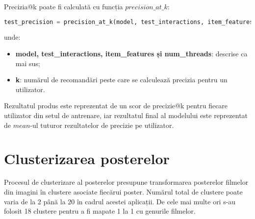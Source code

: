 Precizia@k poate fi calculată cu funcția $precision\_at\_k$:

\begin{lstlisting}[language=Python, caption=\textit{Precizia@k a unui model}]
test_precision = precision_at_k(model, test_interactions, item_features=item_features, k=k, num_threads=threads).mean()
\end{lstlisting}
unde:
\begin{itemize}
	\item \textbf{model, test\_interactions, item\_features și num\_threads}: descrise ca mai sus;
	\item \textbf{k}: numărul de recomandări peste care se calculează precizia pentru un utilizator.
\end{itemize}
Rezultatul produs este reprezentat de un scor de precizie@k pentru fiecare utilizator din setul de antrenare, iar rezultatul final al modelului este reprezentat de $mean$-ul tuturor rezultatelor de precizie pe utilizator.

\section{Clusterizarea posterelor}
Procesul de clusterizare al posterelor presupune transformarea posterelor filmelor din imagini în clustere asociate fiecărui poster. Numărul total de clustere poate varia de la 2 până la 20 în cadrul acestei aplicații. De cele mai multe ori s-au folosit 18 clustere pentru a fi mapate 1 la 1 cu genurile filmelor.

